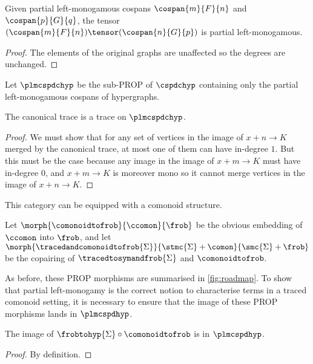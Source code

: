 \begin{lemma}
    Given partial left-monogamous cospans \(\cospan{m}{F}{n}\)
    and \(\cospan{p}{G}{q}\), the tensor \(
        (\cospan{m}{F}{n})
        \tensor
        (\cospan{n}{G}{p})
    \) is partial left-monogamous.
\end{lemma}
\begin{proof}
    The elements of the original graphs are unaffected so
    the degrees are unchanged.
\end{proof}

\begin{definition}
    Let \(\plmcspdchyp\) be the sub-PROP of \(\cspdchyp\) containing only the
    partial left-monogamous cospans of hypergraphs.
\end{definition}

\begin{proposition}
    The canonical trace is a trace on \(\plmcspdchyp\).
\end{proposition}
\begin{proof}
    We must show that for any set of vertices in the image
    of \(x + n \to K\) merged by the canonical trace, at most one of them can
    have in-degree \(1\).
    But this must be the case because any image in the image of
    \(x + m \to K\) must have in-degree \(0\), and \(x + m \to K\) is
    moreover mono so it cannot merge vertices in the image of
    \(x + n \to K\).
\end{proof}

This category can be equipped with a comonoid structure.

\begin{definition}
    Let \(
        \morph{
            \comonoidtofrob
        }{
            \ccomon
        }{
            \frob
        }
    \) be the obvious embedding of \(\ccomon\) into \(\frob\), and let \(
        \morph{
            \tracedandcomonoidtofrob{\Sigma}
        }{
            \stmc{\Sigma} + \comon
        }{
            \smc{\Sigma} + \frob
        }
    \) be the copairing of \(\tracedtosymandfrob{\Sigma}\) and
    \(\comonoidtofrob\).
\end{definition}

As before, these PROP morphisms are summarised in \cref{fig:roadmap}.
To show that partial left-monogamy is the correct notion to characterise terms
in a traced comonoid setting, it is necessary to ensure that the image of these
PROP morphisms lands in \(\plmcspdhyp\).

\begin{lemma}
    The image of \(\frobtohyp{\Sigma} \circ \comonoidtofrob\) is in
    \(\plmcspdhyp\).
\end{lemma}
\begin{proof}
    By definition.
\end{proof}

